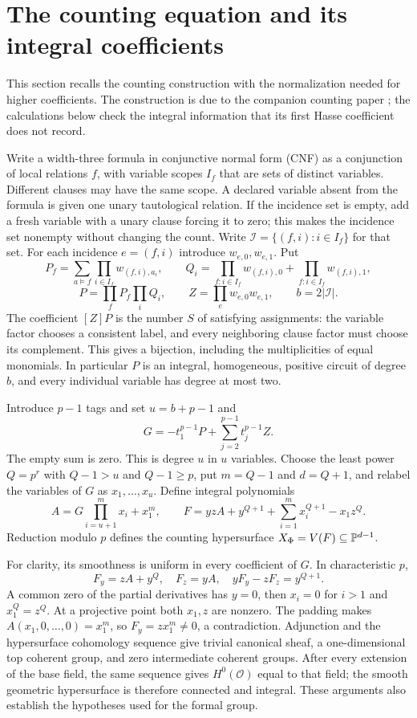 \section{The counting equation and its integral coefficients}\label{sec:construction}
This section recalls the counting construction with the normalization needed for higher coefficients. The construction is due to the companion counting paper \citep[Theorems~1.1--1.2, Sections~2--3]{Counting}; the calculations below check the integral information that its first Hasse coefficient does not record.

Write a width-three formula in conjunctive normal form (CNF) as a conjunction of local relations $f$, with variable scopes $I_f$ that are sets of distinct variables. Different clauses may have the same scope. A declared variable absent from the formula is given one unary tautological relation. If the incidence set is empty, add a fresh variable with a unary clause forcing it to zero; this makes the incidence set nonempty without changing the count. Write $\mathcal I=\{(f,i):i\in I_f\}$ for that set. For each incidence $e=(f,i)$ introduce $w_{e,0},w_{e,1}$. Put
\[
 P_f=\sum_{a\models f}\prod_{i\in I_f}w_{(f,i),a_i},\qquad
 Q_i=\prod_{f:i\in I_f}w_{(f,i),0}+
     \prod_{f:i\in I_f}w_{(f,i),1},
\]
\[
 P=\prod_fP_f\prod_iQ_i,\qquad
 Z=\prod_e w_{e,0}w_{e,1},\qquad b=2|\mathcal I|.
\]
The coefficient $[Z]P$ is the number $S$ of satisfying assignments: the variable factor chooses a consistent label, and every neighboring clause factor must choose its complement. This gives a bijection, including the multiplicities of equal monomials. In particular $P$ is an integral, homogeneous, positive circuit of degree $b$, and every individual variable has degree at most two.

Introduce $p-1$ tags and set $u=b+p-1$ and
\[
 G=-t_1^{p-1}P+\sum_{j=2}^{p-1}t_j^{p-1}Z.
\]
The empty sum is zero. This is degree $u$ in $u$ variables. Choose the least power $Q=p^r$ with $Q-1>u$ and $Q-1\geq p$, put $m=Q-1$ and $d=Q+1$, and relabel the variables of $G$ as $x_1,\ldots,x_u$. Define integral polynomials
\[
 A=G\prod_{i=u+1}^{m}x_i+x_1^m,\qquad
 F=yzA+y^{Q+1}+\sum_{i=1}^{m}x_i^{Q+1}-x_1z^Q.
\]
Reduction modulo $p$ defines the counting hypersurface $X_\Phi=V(F)\subseteq\mathbb P^{d-1}$.

For clarity, its smoothness is uniform in every coefficient of $G$. In characteristic $p$,
\[
 F_y=zA+y^Q,\quad F_z=yA,\quad yF_y-zF_z=y^{Q+1}.
\]
A common zero of the partial derivatives has $y=0$, then $x_i=0$ for $i>1$ and $x_1^Q=z^Q$. At a projective point both $x_1,z$ are nonzero. The padding makes $A(x_1,0,\ldots,0)=x_1^m$, so $F_y=zx_1^m\ne0$, a contradiction. Adjunction and the hypersurface cohomology sequence give trivial canonical sheaf, a one-dimensional top coherent group, and zero intermediate coherent groups. After every extension of the base field, the same sequence gives $H^0(\mathcal O)$ equal to that field; the smooth geometric hypersurface is therefore connected and integral. These arguments also establish the hypotheses used for the formal group.

